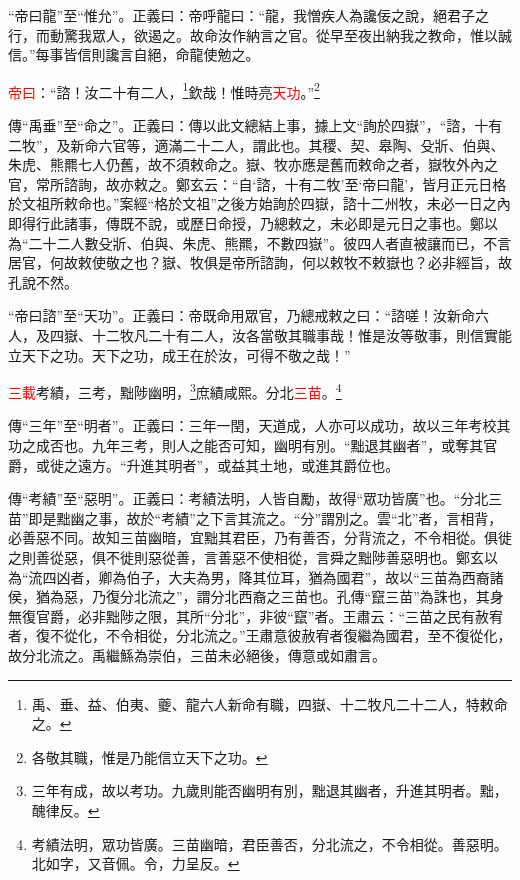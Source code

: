 {\noindent\shu{}\fzkt “帝曰龍”至“惟允”。正義曰：帝呼龍曰：“龍，我憎疾人為讒佞之說，絕君子之行，而動驚我眾人，欲遏之。故命汝作納言之官。從早至夜出納我之教命，惟以誠信。”每事皆信則讒言自絕，命龍使勉之。 \par}

\textcolor{red}{帝曰}：“諮！汝二十有二人，\footnote{禹、垂、益、伯夷、夔、龍六人新命有職，四嶽、十二牧凡二十二人，特敕命之。}欽哉！惟時亮\textcolor{red}{天功}。”\footnote{各敬其職，惟是乃能信立天下之功。}

{\noindent\zhuan{}\fzbyks 傳“禹垂”至“命之”。正義曰：傳以此文總結上事，據上文“詢於四嶽”，“諮，十有二牧”，及新命六官等，適滿二十二人，謂此也。其稷、契、皋陶、殳斨、伯與、朱虎、熊羆七人仍舊，故不須敕命之。嶽、牧亦應是舊而敕命之者，嶽牧外內之官，常所諮詢，故亦敕之。鄭玄云：“自‘諮，十有二牧’至‘帝曰龍’，皆月正元日格於文祖所敕命也。”案經“格於文祖”之後方始詢於四嶽，諮十二州牧，未必一日之內即得行此諸事，傳既不說，或歷日命授，乃總敕之，未必即是元日之事也。鄭以為“二十二人數殳斨、伯與、朱虎、熊羆，不數四嶽”。彼四人者直被讓而已，不言居官，何故敕使敬之也？嶽、牧俱是帝所諮詢，何以敕牧不敕嶽也？必非經旨，故孔說不然。 \par}

{\noindent\shu{}\fzkt “帝曰諮”至“天功”。正義曰：帝既命用眾官，乃總戒敕之曰：“諮嗟！汝新命六人，及四嶽、十二牧凡二十有二人，汝各當敬其職事哉！惟是汝等敬事，則信實能立天下之功。天下之功，成王在於汝，可得不敬之哉！” \par}

\textcolor{red}{三載}考績，三考，黜陟幽明，\footnote{三年有成，故以考功。九歲則能否幽明有別，黜退其幽者，升進其明者。黜，醜律反。}庶績咸熙。分北\textcolor{red}{三苗}。\footnote{考績法明，眾功皆廣。三苗幽暗，君臣善否，分北流之，不令相從。善惡明。北如字，又音佩。令，力呈反。}

{\noindent\zhuan{}\fzbyks 傳“三年”至“明者”。正義曰：三年一閏，天道成，人亦可以成功，故以三年考校其功之成否也。九年三考，則人之能否可知，幽明有別。“黜退其幽者”，或奪其官爵，或徙之遠方。“升進其明者”，或益其土地，或進其爵位也。 \par}

{\noindent\zhuan{}\fzbyks 傳“考績”至“惡明”。正義曰：考績法明，人皆自勵，故得“眾功皆廣”也。“分北三苗”即是黜幽之事，故於“考績”之下言其流之。“分”謂別之。雲“北”者，言相背，必善惡不同。故知三苗幽暗，宜黜其君臣，乃有善否，分背流之，不令相從。俱徙之則善從惡，俱不徙則惡從善，言善惡不使相從，言舜之黜陟善惡明也。鄭玄以為“流四凶者，卿為伯子，大夫為男，降其位耳，猶為國君”，故以“三苗為西裔諸侯，猶為惡，乃復分北流之”，謂分北西裔之三苗也。孔傳“竄三苗”為誅也，其身無復官爵，必非黜陟之限，其所“分北”，非彼“竄”者。王肅云：“三苗之民有赦宥者，復不從化，不令相從，分北流之。”王肅意彼赦宥者復繼為國君，至不復從化，故分北流之。禹繼鯀為崇伯，三苗未必絕後，傳意或如肅言。 \par}

